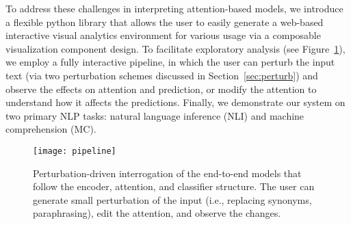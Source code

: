To address these challenges in interpreting attention-based models, 
we introduce a flexible python library that allows the user to easily generate a web-based interactive visual analytics environment for various usage via a composable visualization component design.
%
To facilitate exploratory analysis (see Figure~\ref{fig:modelPipeline}), we employ a fully interactive pipeline, in which the user can perturb the input text (via two perturbation schemes discussed in Section~\ref{sec:perturb}) and observe the effects on attention and prediction, or modify the attention to understand how it affects the predictions.
%
Finally, we demonstrate our system on two primary NLP tasks: natural language
inference (NLI) and machine comprehension (MC). 

\begin{figure}[htbp]
\centering
\vspace{-2mm}
 \texttt{[image: pipeline]}
 \vspace{-3mm}
 \caption{
 Perturbation-driven interrogation of the end-to-end models that follow the encoder, attention, and classifier structure. The user can generate small perturbation of the input (i.e., replacing synonyms, paraphrasing), edit the attention, and observe the changes.
 }
 \vspace{-3mm}
\label{fig:modelPipeline}
\end{figure}


